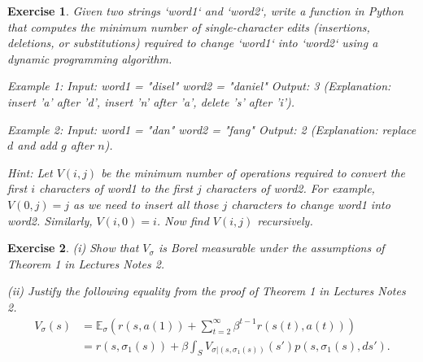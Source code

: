 \documentclass[letter,11pt]{article}
\newtheorem{exercise}{Exercise}[section]
\begin{document}
   \begin{exercise}
    Given two strings `word1` and `word2`, write a function in Python that computes the minimum number of single-character edits (insertions, deletions, or substitutions) required to change `word1` into `word2` using a dynamic programming algorithm.

    Example 1:
    Input: word1 = "disel"
word2 = "daniel"
    Output: 3  (Explanation: insert 'a' after 'd', insert 'n' after 'a', delete 's' after 'i'). 

   Example 2: Input: word1 = "dan"  word2 = "fang"  Output: 2  (Explanation: replace $d$ and add $g$ after $n$).

    Hint: Let $V(i,j)$ be the minimum number of operations required to convert the first $i$ characters of word1 to the first $j$ characters of word2.
For example, $V(0,j) = j$
as we need to insert all those $j$ characters to change word1 into word2. Similarly, $V(i,0)=i$. Now find $V(i,j)$ recursively. 
\end{exercise}



\begin{exercise}
 (i)   Show that $V_{\sigma}$ is Borel measurable under the assumptions of Theorem 1 in Lectures Notes 2. 

 (ii)    Justify the following equality from the proof of Theorem 1 in Lectures Notes 2. 
    \begin{align*}
    V_{\sigma}(s) & = \mathbb{E}_{\sigma } \left ( r(s,a(1)) + \sum \limits_{t =2}^{\infty }\beta^{t -1}r(s(t),a(t)) \right )   \\
    & = r(s,\sigma_{1}(s)) + \beta \int _{S} V_{\sigma | (s,\sigma_{1}(s))} (s') p(s, \sigma_{1}(s),ds'). \\
\end{align*}
\end{exercise}
\end{document}
